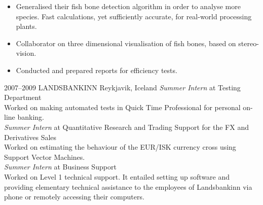 \documentclass[]{cv} %
\begin{document}
\begin{entrylist}
{\begin{itemize}
on fillet's X-Ray imagery. 
\item Generalised their fish bone detection algorithm in order to analyse more species. Fast calculations, yet sufficiently accurate, for real-world processing plants.
\item Collaborator on three dimensional visualisation of fish bones, based on stereo-vision.
\item Conducted and prepared reports for efficiency tests.
\end{itemize}
}
\entry
{2007--2009}
{LANDSBANKINN}
{Reykjavik, Iceland}
{
\emph{Summer Intern} at Testing Department \\ Worked on making automated tests 
in Quick Time Professional for personal on-line banking. 
\\
\emph{Summer Intern} at Quantitative Research and Trading Support for the FX and Derivatives Sales \\ Worked on estimating the behaviour of the EUR/ISK currency cross using Support Vector Machines.
\\
\emph{Summer Intern} at Business Support \\ Worked on Level 1 technical support. It entailed setting up software and providing elementary technical assistance to the employees of Landsbankinn via phone or remotely accessing their computers.
}
\end{entrylist}
\end{document}
